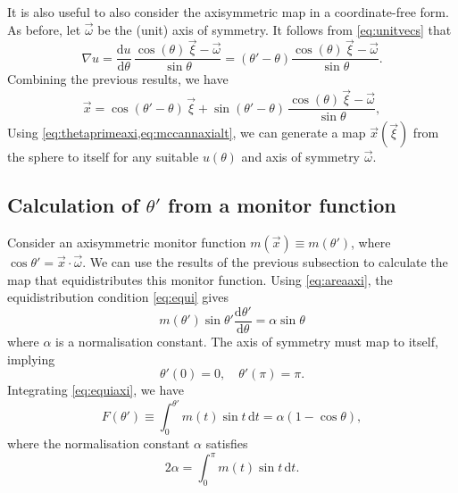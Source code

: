 \documentclass[11pt, a4paper]{scrartcl}  %
\theoremstyle{plain}
\theoremstyle{definition}
\numberwithin{equation}{section}
\newcommand{\dd}[2]{\frac{\mathrm{d} #1}{\mathrm{d} #2}}
\begin{document}
It is also useful to also consider the axisymmetric map in a
coordinate-free form. As before, let $\vec{\omega}$ be the (unit) axis
of symmetry. It follows from \cref{eq:unitvecs} that
\begin{equation}
\label{eq:nablauaxi}
\nabla u = \dd{u}{\theta} \, \frac{\cos(\theta) \, \vec{\xi} - \vec{\omega}}{\sin\theta} = \left( \theta' - \theta \right) \frac{\cos(\theta) \, \vec{\xi} - \vec{\omega}}{\sin\theta}.
\end{equation}
Combining the previous results, we have
\begin{equation}
\label{eq:mccannaxialt}
\vec{x} = \cos(\theta'-\theta) \, \vec{\xi} + \sin(\theta'-\theta) \, \frac{\cos(\theta) \, \vec{\xi} - \vec{\omega}}{\sin\theta},
\end{equation}
Using \cref{eq:thetaprimeaxi,eq:mccannaxialt}, we can generate a map
$\vec{x}(\vec{\xi})$ from the sphere to itself for any suitable
$u(\theta)$ and axis of symmetry $\vec{\omega}$.

\subsection{Calculation of \texorpdfstring{$\theta'$}{theta'} from a monitor function}

Consider an axisymmetric monitor function $m(\vec{x}) \equiv m(\theta')$,
where $\cos\theta' = \vec{x}\cdot\vec{\omega}$. We can use the results
of the previous subsection to calculate the map that equidistributes this
monitor function. Using \cref{eq:areaaxi}, the equidistribution
condition \cref{eq:equi} gives
\begin{equation}
\label{eq:equiaxi}
m(\theta') \sin\theta' \dd{\theta'}{\theta} = \alpha \sin\theta
\end{equation}
where $\alpha$ is a normalisation constant. The axis of symmetry must
map to itself, implying
\begin{equation}
\label{eq:axibcs}
\theta'(0) = 0, \quad \theta'(\pi) = \pi.
\end{equation}
Integrating \cref{eq:equiaxi}, we have
\begin{equation}
\label{eq:axiintegral}
F(\theta') \equiv \int_{0}^{\theta'} m(t) \sin t \,\mathrm{d}t = \alpha (1 - \cos\theta),
\end{equation}
where the normalisation constant $\alpha$ satisfies
\begin{equation}
\label{eq:axialpha}
2 \alpha = \int_{0}^{\pi} m(t) \sin t \,\mathrm{d}t.
\end{equation}
\end{document}
